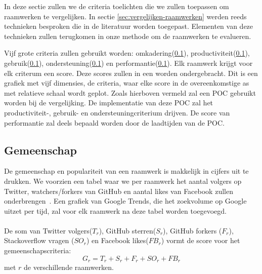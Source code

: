 In deze sectie zullen we de criteria toelichten die we zullen toepassen om raamwerken te vergelijken.
In sectie \ref{sec:vergelijken-raamwerken} werden reeds technieken besproken die in de literatuur worden toegepast.
Elementen van deze technieken zullen terugkomen in onze methode om de raamwerken te evalueren.

Vijf grote criteria zullen gebruikt worden:  omkadering(\ref{sec:vergelijking-gemeenschap}), productiviteit(\ref{sec:vergelijking-gemeenschap}), gebruik(\ref{sec:vergelijking-gemeenschap}), ondersteuning(\ref{sec:vergelijking-gemeenschap}) en performantie(\ref{sec:vergelijking-gemeenschap}). Elk raamwerk krijgt voor elk criterum een score. 
Deze scores zullen in een  worden ondergebracht.  
Dit is een grafiek met vijf dimensies,  de criteria,     waar elke score in de overeenkomstige as met relatieve schaal wordt geplot.
Zoals hierboven vermeld zal een POC gebruikt worden bij de vergelijking.
De implementatie van deze POC zal het productiviteit-, gebruik- en ondersteuningcriterium drijven.  
De score van performantie zal deels bepaald worden door de laadtijden van de POC.



\subsection{Gemeenschap}
\label{sec:vergelijking-gemeenschap}
De gemeenschap en populariteit van een raamwerk is makkelijk in cijfers uit te drukken. 
We voorzien een tabel waar we per raamwerk het aantal volgers op Twitter, watchers/forkers van GitHub en aantal likes van Facebook zullen onderbrengen~\cite{Sarrafi2012a,Ayuso2012}. 
Een grafiek van Google Trends, die het zoekvolume op Google uitzet per tijd, zal voor elk raamwerk na deze tabel worden toegevoegd.
\paragraph{}
De som van Twitter volgers($T_r$), GitHub sterren($S_r$), GitHub forkers ($F_r$), Stackoverflow vragen ($SO_r$) en Facebook likes($FB_r$) vormt de score voor het gemeenschapscriteria:
\begin{equation}
  G_r=T_r+S_r+F_r+SO_r+FB_r
  \label{eq:gemeenschap}
\end{equation}
met $r$ de verschillende raamwerken.

